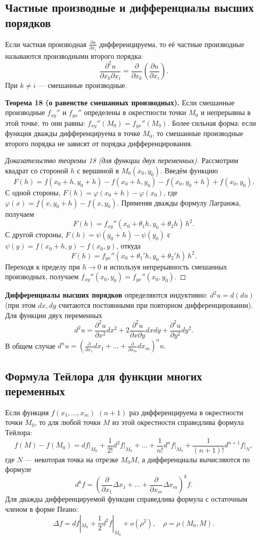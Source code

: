 \documentclass{article}
\theoremstyle{definition}
\begin{document}
\subsection{Частные производные и дифференциалы высших порядков}
Если частная производная $\frac{\partial u}{\partial x_i}$ дифференцируема, то её частные производные называются производными второго порядка:
\[
\frac{\partial^2 u}{\partial x_k\partial x_i}=\frac{\partial}{\partial x_k}\left(\frac{\partial u}{\partial x_i}\right).
\]
При $k\neq i$ — смешанные производные.

\textbf{Теорема 18 (о равенстве смешанных производных).} Если смешанные производные $f_{xy}''$ и $f_{yx}''$ определены в окрестности точки $M_0$ и непрерывны в этой точке, то они равны: $f_{xy}''(M_0)=f_{yx}''(M_0)$. Более сильная форма: если функция дважды дифференцируема в точке $M_0$, то смешанные производные второго порядка не зависят от порядка дифференцирования.

\begin{proof}[Доказательство теоремы 18 (для функции двух переменных)]
Рассмотрим квадрат со стороной $h$ с вершиной в $M_0(x_0,y_0)$. Введём функцию
\[
F(h)=f(x_0+h,y_0+h)-f(x_0+h,y_0)-f(x_0,y_0+h)+f(x_0,y_0).
\]
С одной стороны, $F(h)=\varphi(x_0+h)-\varphi(x_0)$, где $\varphi(x)=f(x,y_0+h)-f(x,y_0)$. Применяя дважды формулу Лагранжа, получаем
\[
F(h)=f_{xy}''(x_0+\theta_1h,y_0+\theta_2h)\,h^2.
\]
С другой стороны, $F(h)=\psi(y_0+h)-\psi(y_0)$ с $\psi(y)=f(x_0+h,y)-f(x_0,y)$, откуда
\[
F(h)=f_{yx}''(x_0+\theta_1'h,y_0+\theta_2'h)\,h^2.
\]
Переходя к пределу при $h\to0$ и используя непрерывность смешанных производных, получаем $f_{xy}''(x_0,y_0)=f_{yx}''(x_0,y_0)$.
\end{proof}

\textbf{Дифференциалы высших порядков} определяются индуктивно: $d^2u=d(du)$ (при этом $dx,dy$ считаются постоянными при повторном дифференцировании). Для функции двух переменных
\[
d^2u = \frac{\partial^2 u}{\partial x^2}dx^2 + 2\frac{\partial^2 u}{\partial x\partial y}dxdy + \frac{\partial^2 u}{\partial y^2}dy^2.
\]
В общем случае $d^n u = \left(\frac{\partial}{\partial x_1}dx_1+\dots+\frac{\partial}{\partial x_m}dx_m\right)^n u$.

\subsection{Формула Тейлора для функции многих переменных}
Если функция $f(x_1,\dots,x_m)$ $(n+1)$ раз дифференцируема в окрестности точки $M_0$, то для любой точки $M$ из этой окрестности справедлива формула Тейлора:
\[
f(M)-f(M_0)=df\big|_{M_0}+\frac{1}{2!}d^2f\big|_{M_0}+\dots+\frac{1}{n!}d^nf\big|_{M_0}+\frac{1}{(n+1)!}d^{n+1}f\big|_{N},
\]
где $N$ — некоторая точка на отрезке $M_0M$, а дифференциалы вычисляются по формуле
\[
d^k f = \left(\frac{\partial}{\partial x_1}\Delta x_1+\dots+\frac{\partial}{\partial x_m}\Delta x_m\right)^k f.
\]
Для дважды дифференцируемой функции справедлива формула с остаточным членом в форме Пеано:
\[
\Delta f = df|_{M_0} + \frac{1}{2}d^2f|_{M_0} + o(\rho^2),\quad \rho=\rho(M_0,M).
\]
\end{document}
